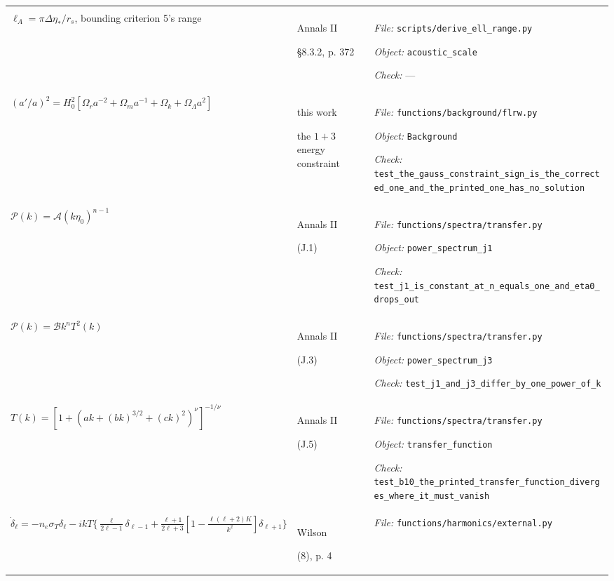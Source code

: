 \begin{landscape}
\begin{longtable}{@{}>{\raggedright\arraybackslash}p{80mm}
                     >{\raggedright\arraybackslash}p{38mm}
                     >{\raggedright\arraybackslash}p{99mm}@{}}
{\textit{Check:} \nolinkurl{test_corrected_bessel_identity_matches_quadrature}} \\
\addlinespace[2pt]
$\ell_A = \pi\Delta\eta_*/r_s$, bounding criterion 5's range & Annals II\par \S8.3.2, p. 372 & {\scriptsize \textit{File:} \nolinkurl{scripts/derive_ell_range.py}\par
\textit{Object:} \nolinkurl{acoustic_scale}\par
\textit{Check:} ---} \\
\addlinespace[2pt]
$(a'/a)^2 = H_0^2[\Omega_r a^{-2}+\Omega_m a^{-1}+\Omega_k+\Omega_\Lambda a^2]$ & this work\par the $1+3$ energy constraint & {\scriptsize \textit{File:} \nolinkurl{functions/background/flrw.py}\par
\textit{Object:} \nolinkurl{Background}\par
\textit{Check:} \nolinkurl{test_the_gauss_constraint_sign_is_the_corrected_one_and_the_printed_one_has_no_solution}} \\
\addlinespace[2pt]
$\mathcal P(k) = \mathcal A(k\eta_0)^{n-1}$ & Annals II\par (J.1) & {\scriptsize \textit{File:} \nolinkurl{functions/spectra/transfer.py}\par
\textit{Object:} \nolinkurl{power_spectrum_j1}\par
\textit{Check:} \nolinkurl{test_j1_is_constant_at_n_equals_one_and_eta0_drops_out}} \\
\addlinespace[2pt]
$\mathcal P(k) = \mathcal B k^n T^2(k)$ & Annals II\par (J.3) & {\scriptsize \textit{File:} \nolinkurl{functions/spectra/transfer.py}\par
\textit{Object:} \nolinkurl{power_spectrum_j3}\par
\textit{Check:} \nolinkurl{test_j1_and_j3_differ_by_one_power_of_k}} \\
\addlinespace[2pt]
$T(k) = [1+(ak+(bk)^{3/2}+(ck)^2)^\nu]^{-1/\nu}$ & Annals II\par (J.5) & {\scriptsize \textit{File:} \nolinkurl{functions/spectra/transfer.py}\par
\textit{Object:} \nolinkurl{transfer_function}\par
\textit{Check:} \nolinkurl{test_b10_the_printed_transfer_function_diverges_where_it_must_vanish}} \\
\addlinespace[2pt]
$\dot\delta_\ell = -n_e\sigma_T\delta_\ell - ikT\{\frac{\ell}{2\ell-1}\delta_{\ell-1} + \frac{\ell+1}{2\ell+3}[1-\frac{\ell(\ell+2)K}{k^2}]\delta_{\ell+1}\}$ & Wilson\par (8), p. 4 & {\scriptsize \textit{File:} \nolinkurl{functions/harmonics/external.py}\par
}
\end{longtable}
\end{landscape}
